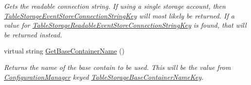 \begin{DoxyCompactItemize}
\begin{DoxyCompactList}\small\item\em Gets the readable connection string. If using a single storage account, then \hyperlink{classCqrs_1_1Azure_1_1BlobStorage_1_1Events_1_1TableStorageEventStoreConnectionStringFactory_a95f8662029c8a40117e326973de936bf_a95f8662029c8a40117e326973de936bf}{Table\+Storage\+Event\+Store\+Connection\+String\+Key} will most likely be returned. If a value for \hyperlink{classCqrs_1_1Azure_1_1BlobStorage_1_1Events_1_1TableStorageEventStoreConnectionStringFactory_ac28aea2439fe0bed85d1b53c0fd8fdaf_ac28aea2439fe0bed85d1b53c0fd8fdaf}{Table\+Storage\+Readable\+Event\+Store\+Connection\+String\+Key} is found, that will be returned instead. \end{DoxyCompactList}\item 
virtual string \hyperlink{classCqrs_1_1Azure_1_1BlobStorage_1_1Events_1_1TableStorageEventStoreConnectionStringFactory_a118388598a7fa653122fc11521c915d7_a118388598a7fa653122fc11521c915d7}{Get\+Base\+Container\+Name} ()
\begin{DoxyCompactList}\small\item\em Returns the name of the base contain to be used. This will be the value from \hyperlink{namespaceCqrs_1_1Azure_1_1ConfigurationManager}{Configuration\+Manager} keyed \hyperlink{classCqrs_1_1Azure_1_1BlobStorage_1_1Events_1_1TableStorageEventStoreConnectionStringFactory_a9aad5e7497e3f5192d3aaec8d5f7b5f8_a9aad5e7497e3f5192d3aaec8d5f7b5f8}{Table\+Storage\+Base\+Container\+Name\+Key}. \end{DoxyCompactList}\end{DoxyCompactItemize}
